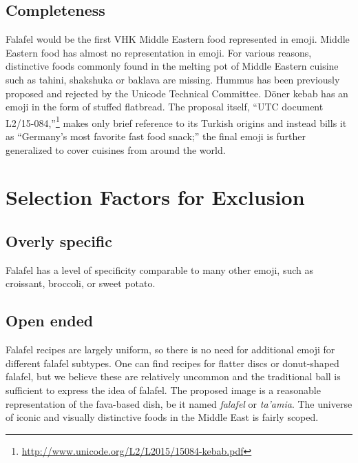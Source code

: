\documentclass[a4paper,10pt]{article}
\begin{document}
\subsection{Completeness}
Falafel would be the first VHK Middle Eastern food represented in emoji.
Middle Eastern food has almost no representation in emoji. For various reasons, distinctive foods
commonly found in the melting pot of Middle Eastern cuisine such as tahini, shakshuka or
baklava are missing. 
{\sc Hummus} has been previously proposed and rejected by the Unicode Technical Committee. 
 D\"oner kebab has an emoji in the form
of {\sc stuffed flatbread}. The proposal itself, ``UTC document
L2/15-084,''\footnote{\url{http://www.unicode.org/L2/L2015/15084-kebab.pdf}} makes
only brief reference to its Turkish origins and instead bills it as ``Germany's most
favorite fast food snack;'' the final emoji is further generalized to cover cuisines from around the world.

\section{Selection Factors for Exclusion}

\subsection{Overly specific}

{\sc Falafel} has a level of specificity comparable to many other emoji, such as
{\sc croissant}, {\sc broccoli}, or {\sc sweet potato}.

\subsection{Open ended}

Falafel recipes are largely uniform, so there is no need for additional emoji for
different falafel subtypes. One can find recipes for flatter discs or donut-shaped
falafel, but we believe these are relatively uncommon and the traditional ball is
sufficient to express the idea of falafel. The proposed image is a reasonable
representation of the fava-based dish, be it named {\em falafel} or {\em ta'amia}.
The universe of iconic and visually distinctive foods in the Middle East is fairly scoped.
\end{document}

